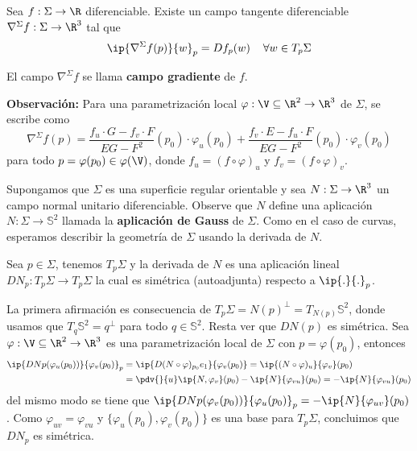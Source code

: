 \documentclass{article}
\begin{document}
\begin{prop}
    Sea $f:\Sigma\to\R$ diferenciable. Existe un campo tangente diferenciable 
    $\nabla^{\Sigma}f:\Sigma\to\R^{3}$ tal que
    \begin{equation*}
        \ip{\nabla^{\Sigma}f(p)}{w}_{p}=Df_{p}(w)\hspace{4mm}\forall w\in T_{p}\Sigma
    \end{equation*}
\end{prop}

\begin{dfn}
    El campo $\nabla^{\Sigma}f$ se llama \textbf{campo gradiente} de $f$.
\end{dfn}

\noindent\textbf{Observación:} Para una parametrización local $\varphi:\V\subseteq\R^{2}\to\R^{3}$ 
de $\Sigma$, se escribe como
\begin{equation*}
    \nabla^{\Sigma}f(p)=\frac{f_{u}\cdot G-f_{v}\cdot F}{EG-F^{2}}(p_{0})\cdot\varphi_{u}(p_{0})+
    \frac{f_{v}\cdot E-f_{u}\cdot F}{EG-F^{2}}(p_{0})\cdot\varphi_{v}(p_{0})
\end{equation*}
para todo $p=\varphi(p_{0})\in\varphi(\V)$, donde $f_{u}=(f\circ\varphi)_{u}$ y 
$f_{v}=(f\circ\varphi)_{v}$.

\vspace{2mm}
\noindent Supongamos que $\Sigma$ es una superficie regular orientable y sea $N:\Sigma\to\R^{3}$
un campo normal unitario diferenciable. Observe que $N$ define una aplicación 
$N:\Sigma\to\mathbb{S}^{2}$ llamada la \textbf{aplicación de Gauss} de $\Sigma$. Como en el caso 
de curvas, esperamos describir la geometría de $\Sigma$ usando la derivada de $N$.

\begin{prop}
    Sea $p\in\Sigma$, tenemos $T_{p}\Sigma$ y la derivada de $N$ es una aplicación lineal 
    $DN_{p}:T_{p}\Sigma\to T_{p}\Sigma$ la cual es simétrica (autoadjunta) respecto a 
    $\ip{.}{.}_{p}$.
\end{prop}

\begin{dem}
    La primera afirmación es consecuencia de $T_{p}\Sigma=N(p)^{\perp}=T_{N(p)}\mathbb{S}^{2}$,
    donde usamos que $T_{q}\mathbb{S}^{2}=q^{\perp}$ para todo $q\in\mathbb{S}^{2}$. Resta ver que
    $DN(p)$ es simétrica. Sea $\varphi:\V\subseteq\R^{2}\to\R^{3}$ es una parametrización local de
    $\Sigma$ con $p=\varphi(p_{0})$, entonces
    \begin{align*}
        \ip{DNp(\varphi_{u}(p_{0}))}{\varphi_{v}(p_{0})}_{p} &= \ip{D(N\circ\varphi)_{p_{0}}e_{1}}
        {\varphi_{v}(p_{0})}=\ip{(N\circ\varphi)_{u}}{\varphi_{v}}(p_{0}) \\
        &= \pdv{}{u}\ip{N,\varphi_{v}}(p_{0})-\ip{N}{\varphi_{vu}}(p_{0})=
        -\ip{N}{\varphi_{vu}}(p_{0})
    \end{align*}
    del mismo modo se tiene que $\ip{DNp(\varphi_{v}(p_{0}))}{\varphi_{u}(p_{0})}_{p}=
    -\ip{N}{\varphi_{uv}}(p_{0})$. Como $\varphi_{uv}=\varphi_{vu}$ y $\{\varphi_{u}(p_{0}),
    \varphi_{v}(p_{0})\}$ es una base para $T_{p}\Sigma$, concluimos que $DN_{p}$ es simétrica.
\end{dem}
\end{document}
